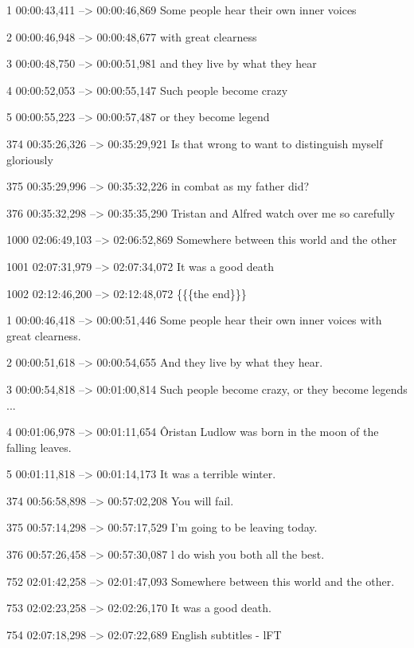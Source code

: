 \begin{subexam}
1
00:00:43,411 --> 00:00:46,869
Some people hear their own
inner voices

2
00:00:46,948 --> 00:00:48,677
with great clearness

3
00:00:48,750 --> 00:00:51,981
and they live
by what they hear

4
00:00:52,053 --> 00:00:55,147
Such people become crazy

5
00:00:55,223 --> 00:00:57,487
or they become legend

374
00:35:26,326 --> 00:35:29,921
Is that wrong to want
to distinguish myself gloriously

375
00:35:29,996 --> 00:35:32,226
in combat as my father did?

376
00:35:32,298 --> 00:35:35,290
Tristan and Alfred
watch over me so carefully

1000
02:06:49,103 --> 02:06:52,869
Somewhere between this world
and the other

1001
02:07:31,979 --> 02:07:34,072
It was a good death

1002
02:12:46,200 --> 02:12:48,072
\{\{\{the end\}\}\}
\end{subexam}
\hspace{0.5cm}
\begin{subexam}
1
00:00:46,418 --> 00:00:51,446
Some people hear their own
inner voices with great clearness.

2
00:00:51,618 --> 00:00:54,655
And they live by what they hear.

3
00:00:54,818 --> 00:01:00,814
Such people become crazy,
or they become legends ...

4
00:01:06,978 --> 00:01:11,654
Ôristan Ludlow was born
in the moon of the falling leaves.

5
00:01:11,818 --> 00:01:14,173
It was a terrible winter.

374
00:56:58,898 --> 00:57:02,208
You will fail.

375
00:57:14,298 --> 00:57:17,529
I'm going to be leaving today.

376
00:57:26,458 --> 00:57:30,087
l do wish you both all the best.

752
02:01:42,258 --> 02:01:47,093
Somewhere between this world
and the other.

753
02:02:23,258 --> 02:02:26,170
It was a good death.

754
02:07:18,298 --> 02:07:22,689
English subtitles - lFT
\end{subexam}

